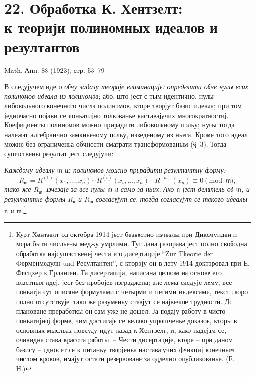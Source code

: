 \documentclass[11pt]{article}
\providecommand{\mideal}{\mathfrak m}
\providecommand{\nideal}{\mathfrak n}
\providecommand{\zero}[1]{\equiv 0\pmod{#1}}
\begin{document}
\setcounter{footnote}{0}
\section*{22. Обработка К. Хентзелт:\\ к теорији полиномных идеалов и резултантов}
\begin{center}
Math. Анн. 88 (1923), стр. 53--79
\end{center}

В следујучем иде о \emph{обчу задачу теорије елиминације: определити обче нулы всих полиномов идеала из полиномов}; або, што јест с тым идентично, нулы либовольного конечного числа полиномов, кторе творјут базис идеала; при том једночасно појави се поньатијно толкованье наставајучих многократностиј. Коефициенты полиномов можно прирадити либовольному польу; нулы тогда належат алгебраично замкньеному польу, изведеному из ньега. Кроме того идеал можно без ограниченьа обчности сматрати трансформованым (§~3). Тогда сушчствены резултат јест следујучи:

\emph{Каждому идеалу $\mideal$ из полиномов можно прирадити резултантну форму:}
\[
 R_{\mideal}=R^{(1)}(x_1,\ldots,x_n)\cdots
 R^{(i)}(x_i,\ldots,x_n)\cdots R^{(n)}(x_n)\zero{\mideal},
\]
\emph{тако же $R_{\mideal}$ изчезаје за все нулы $\mideal$ и само за ньих. Ако $\nideal$ јест делитель од $\mideal$, и резултантне формы $R_{\nideal}$ и $R_{\mideal}$ согласујут се, тогда согласујут се такого идеалы $\nideal$ и $\mideal$.}\footnote{Курт Хентзелт од октобра 1914 јест безвестно изчезлы при Диксмуиден и мора быти числьены меджу умрлими. Тут дана разправа јест полно свободна обработка најсушчственеј чести его дисертације ``Zur Theorie der Форменмодулн und Ресултантен'', с ктороју он в лету 1914 докторовал при Е. Фисцхер в Ерланген. Та дисертација, написана целком на основе его властных идеј, јест без пробојев изграджена; але лема следује лему, все поньатја сут описане формулами с четырми и петими индексами, текст скоро полно отсутствује, тако же разуменьу ставјут се највечше трудности. До плановане преработкы он сам уже не дошел. Ја подају работу в чисто поньатијној форме, чим достигаје се велико упрошченье доказов, кторы в основных мысльах повсуду идут назад к Хентзелт, и, како надејам се, очивидна става красота работы. -- Чести дисертације, кторе -- при даном базису -- односет се к питаньу творјеньа наставајучих функциј конечным числом кроков, имајут остати резервоване за одделно опубликованье. (Е. Н.)}
\end{document}
